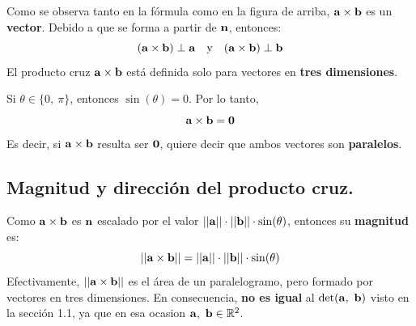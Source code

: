\documentclass[12pt]{article}
\begin{document}
\begin{figure}[hbt!]
\centering


\end{figure}

Como se observa tanto en la fórmula como en la figura de arriba, $\mathbf{a} \times \mathbf{b}$ es un \textbf{vector}. Debido a que se forma a partir de $\mathbf{n}$, entonces:
\[
  (\mathbf{a} \times \mathbf{b}) \perp \mathbf{a} \quad \text{y} \quad (\mathbf{a} \times \mathbf{b}) \perp \mathbf{b}
\]
El producto cruz $\mathbf{a} \times \mathbf{b}$ está definida solo para vectores en \textbf{tres dimensiones}.

Si $\theta \in \{0, \ \pi\}$, entonces $\sin(\theta) = 0$. Por lo tanto,
\[
  \mathbf{a} \times \mathbf{b} = \mathbf{0}
\]
Es decir, si $\mathbf{a} \times \mathbf{b}$ resulta ser $\mathbf{0}$, quiere decir que ambos vectores son \textbf{paralelos}.

\subsection{Magnitud y dirección del producto cruz.}

Como $\mathbf{a} \times \mathbf{b}$ es $\mathbf{n}$ escalado por el valor $||\mathbf{a}|| \cdot ||\mathbf{b}|| \cdot \sin(\theta)$, entonces su \textbf{magnitud} es:
\[
  ||\mathbf{a} \times \mathbf{b}|| = ||\mathbf{a}|| \cdot ||\mathbf{b}|| \cdot \sin(\theta)
\]
Efectivamente, $||\mathbf{a} \times \mathbf{b}||$ es el área de un paralelogramo, pero formado por vectores en tres dimensiones. En consecuencia, \textbf{no es igual} al $\det(\mathbf{a}, \ \mathbf{b})$ visto en la sección 1.1, ya que en esa ocasion $\mathbf{a}, \ \mathbf{b} \in \mathbb{R}^{2}$.
\end{document}
